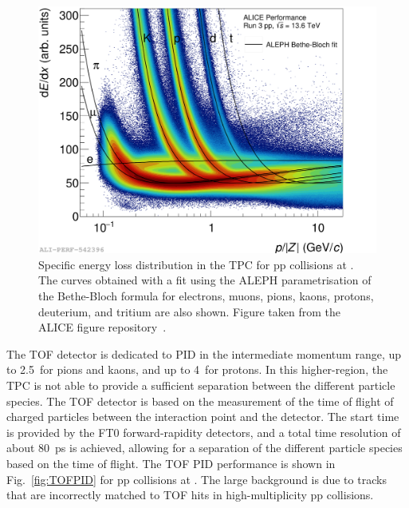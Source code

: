 \begin{figure}[htb]
    \centering
    \includegraphics[width=0.7\linewidth]{Figures/Chapter 4/tpcdedx_1.png}
    \caption{Specific energy loss distribution \dedx in the TPC for pp collisions at \thirteen. The curves obtained with a fit using the ALEPH parametrisation of the Bethe-Bloch formula for electrons, muons, pions, kaons, protons, deuterium, and tritium are also shown. Figure taken from the ALICE figure repository~\cite{ALICE_figures}.}
    \label{fig:ITSTPCPID}
\end{figure}

The TOF detector is dedicated to PID in the intermediate momentum range, up to 2.5~\gevc for pions and kaons, and up to 4~\gevc for protons. In this higher-\pt region, the TPC is not able to provide a sufficient separation between the different particle species. The TOF detector is based on the measurement of the time of flight of charged particles between the interaction point and the detector. The start time is provided by the FT0 forward-rapidity detectors, and a total time resolution of about 80~ps is achieved, allowing for a separation of the different particle species based on the time of flight. The TOF PID performance is shown in Fig.~\ref{fig:TOFPID} for pp collisions at \thirteen. The large background is due to tracks that are incorrectly matched to TOF hits in high-multiplicity pp collisions.

